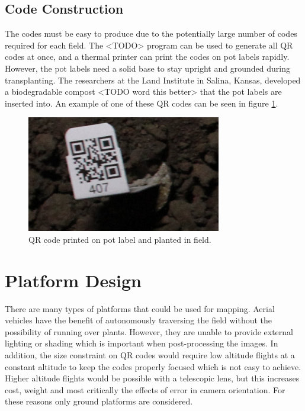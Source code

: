 \subsection{Code Construction}

The codes must be easy to produce due to the potentially large number of codes required for each field.  The <TODO> program can be used to generate all QR codes at once, and a thermal printer can print the codes on pot labels rapidly.  However, the pot labels need a solid base to stay upright and grounded during transplanting. The researchers at the Land Institute in Salina, Kansas, developed a biodegradable compost <TODO word this better> that the pot labels are inserted into.  An example of one of these QR codes can be seen in figure \ref{QR_code}.

\begin{figure}[htb]
	\centering
    \includegraphics[height=2in]{figures/qr_code_407.png}
    \caption[QR code]{QR code printed on pot label and planted in field.}
    \label{QR_code}
\end{figure}

\section{Platform Design}
\label{section:platform_design}

There are many types of platforms that could be used for mapping.  Aerial vehicles have the benefit of autonomously traversing the field without the possibility of running over plants. However, they are unable to provide external lighting or shading which is important when post-processing the images. In addition, the size constraint on QR codes would require low altitude flights at a constant altitude to keep the codes properly focused which is not easy to achieve.  Higher altitude flights would be possible with a telescopic lens, but this increases cost, weight and most critically the effects of error in camera orientation.  For these reasons only ground platforms are considered.

